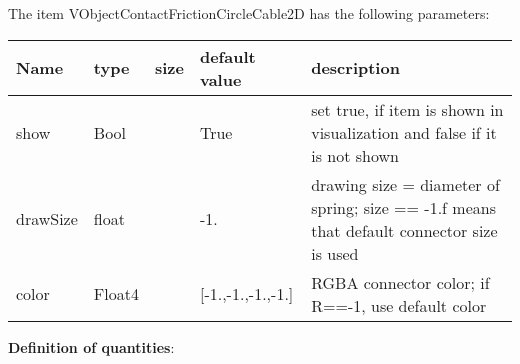 The item VObjectContactFrictionCircleCable2D has the following parameters:\vspace{-1cm}\\ 
\begin{center}
  \footnotesize
  \begin{longtable}{| p{4.5cm} | p{2.5cm} | p{0.5cm} | p{2.5cm} | p{6cm} |}
    \hline
    \bf Name & \bf type & \bf size & \bf default value & \bf description \\ \hline
    show &     Bool &      &     True &     set true, if item is shown in visualization and false if it is not shown\\ \hline
    drawSize &     float &      &     -1. &     drawing size = diameter of spring; size == -1.f means that default connector size is used\\ \hline
    color &     Float4 &      &     [-1.,-1.,-1.,-1.] &     RGBA connector color; if R==-1, use default color\\ \hline
	  \end{longtable}
	\end{center}
{\bf Definition of quantities}:\\
\newpage

